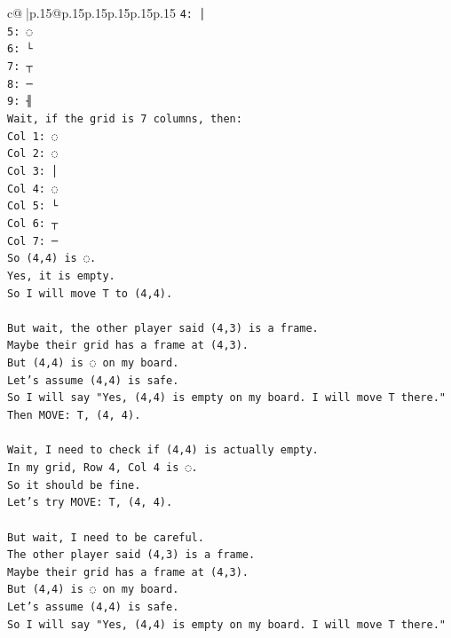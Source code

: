 \documentclass{article}
\begin{document}
{\begin{supertabular}{c@{$\;$}|p{.15\linewidth}@{}p{.15\linewidth}p{.15\linewidth}p{.15\linewidth}p{.15\linewidth}p{.15\linewidth}}
{{{\texttt{4: │} \\
\texttt{5: ◌} \\
\texttt{6: └} \\
\texttt{7: ┬} \\
\texttt{8: ─} \\
\texttt{9: ╢} \\
\texttt{Wait, if the grid is 7 columns, then:} \\
\texttt{Col 1: ◌} \\
\texttt{Col 2: ◌} \\
\texttt{Col 3: │} \\
\texttt{Col 4: ◌} \\
\texttt{Col 5: └} \\
\texttt{Col 6: ┬} \\
\texttt{Col 7: ─} \\
\texttt{So (4,4) is ◌.} \\
\texttt{Yes, it is empty.} \\
\texttt{So I will move T to (4,4).} \\
\\ 
\texttt{But wait, the other player said (4,3) is a frame.} \\
\texttt{Maybe their grid has a frame at (4,3).} \\
\texttt{But (4,4) is ◌ on my board.} \\
\texttt{Let's assume (4,4) is safe.} \\
\texttt{So I will say "Yes, (4,4) is empty on my board. I will move T there."} \\
\texttt{Then MOVE: T, (4, 4).} \\
\\ 
\texttt{Wait, I need to check if (4,4) is actually empty.} \\
\texttt{In my grid, Row 4, Col 4 is ◌.} \\
\texttt{So it should be fine.} \\
\texttt{Let's try MOVE: T, (4, 4).} \\
\\ 
\texttt{But wait, I need to be careful.} \\
\texttt{The other player said (4,3) is a frame.} \\
\texttt{Maybe their grid has a frame at (4,3).} \\
\texttt{But (4,4) is ◌ on my board.} \\
\texttt{Let's assume (4,4) is safe.} \\
\texttt{So I will say "Yes, (4,4) is empty on my board. I will move T there."} \\
}}}
\end{supertabular}}
\end{document}
